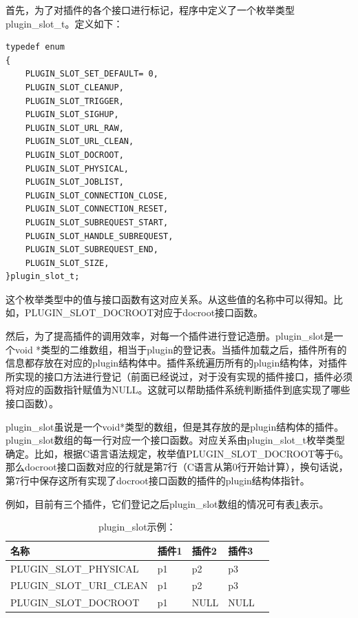 \documentclass[twoside, xetex]{report}
\begin{document}
	首先，为了对插件的各个接口进行标记，程序中定义了一个枚举类型plugin\_slot\_t。定义如下：
\begin{lstlisting}
typedef enum
{
	PLUGIN_SLOT_SET_DEFAULT= 0,
	PLUGIN_SLOT_CLEANUP,
	PLUGIN_SLOT_TRIGGER,
	PLUGIN_SLOT_SIGHUP,
	PLUGIN_SLOT_URL_RAW,
	PLUGIN_SLOT_URL_CLEAN,
	PLUGIN_SLOT_DOCROOT,
	PLUGIN_SLOT_PHYSICAL,
	PLUGIN_SLOT_JOBLIST,
	PLUGIN_SLOT_CONNECTION_CLOSE,
	PLUGIN_SLOT_CONNECTION_RESET,
	PLUGIN_SLOT_SUBREQUEST_START,
	PLUGIN_SLOT_HANDLE_SUBREQUEST,
	PLUGIN_SLOT_SUBREQUEST_END,
	PLUGIN_SLOT_SIZE, 			
}plugin_slot_t;
\end{lstlisting}

	这个枚举类型中的值与接口函数有这对应关系。从这些值的名称中可以得知。比如，PLUGIN\_SLOT\_DOCROOT对应于docroot接口函数。
	
	然后，为了提高插件的调用效率，对每一个插件进行登记造册。plugin\_slot是一个void *类型的二维数组，相当于plugin的登记表。当插件加载之后，插件所有的信息都存放在对应的plugin结构体中。插件系统遍历所有的plugin结构体，对插件所实现的接口方法进行登记（前面已经说过，对于没有实现的插件接口，插件必须将对应的函数指针赋值为NULL。这就可以帮助插件系统判断插件到底实现了哪些接口函数）。
	
	plugin\_slot虽说是一个void*类型的数组，但是其存放的是plugin结构体的插件。plugin\_slot数组的每一行对应一个接口函数。对应关系由plugin\_slot\_t枚举类型确定。比如，根据C语言语法规定，枚举值PLUGIN\_SLOT\_DOCROOT等于6。那么docroot接口函数对应的行就是第7行（C语言从第0行开始计算），换句话说，第7行中保存这所有实现了docroot接口函数的插件的plugin结构体指针。
	
	例如，目前有三个插件，它们登记之后plugin\_slot数组的情况可有表\ref{example_plugin}表示。
	\begin{table}[htbp]
	\caption{plugin\_slot示例：}
	\label{example_plugin}
	\centering
	\begin{tabularx}{\textwidth}{p{6cm}XXXl} %
	\toprule
	\centering 名称 & \centering  插件1 & \centering  插件2 &\centering 插件3&\\
	\midrule
	\centering PLUGIN\_SLOT\_PHYSICAL &\centering  p1 &\centering  p2 &\centering  p3&\\
	\centering PLUGIN\_SLOT\_URI\_CLEAN &\centering  p1 &\centering  p2 &\centering  p3&\\
	\centering PLUGIN\_SLOT\_DOCROOT &\centering  p1 & \centering NULL & \centering NULL&\\
	\bottomrule
	\end{tabularx}
	\end{table}
	
\end{document}
